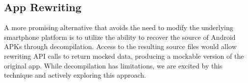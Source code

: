 \subsection{App Rewriting}

A more promising alternative that avoids the need to modify the underlying
smartphone platform is to utilize the ability to recover the source of
Android APKs through decompilation. Access to the resulting source files
would allow rewriting API calls to return mocked data, producing a mockable
version of the original app. While decompilation has limitations, we are
excited by this technique and actively exploring this approach.
